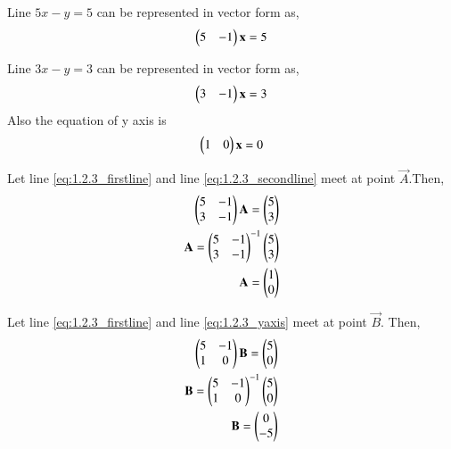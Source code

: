 
 Line $5x-y=5$ can be represented in vector form as,
\begin{align}
\label{eq:1.2.3_firstline}
\begin{pmatrix}5&-1\end{pmatrix}\mathbf{x}=5
\end{align}

 Line $3x-y=3$ can be represented in vector form as,
\begin{align}
\label{eq:1.2.3_secondline}
\begin{pmatrix}3&-1\end{pmatrix}\mathbf{x}=3
\end{align}
%
Also the equation of y axis is 
\begin{align}
\begin{pmatrix}1&0\end{pmatrix}\mathbf{x}=0
\label{eq:1.2.3_yaxis}
\end{align}

Let line \eqref{eq:1.2.3_firstline} and  line \eqref{eq:1.2.3_secondline} meet at point $\vec{A}$.Then, 
\begin{align}
\begin{pmatrix}5&-1\\3&-1\end{pmatrix}\mathbf{A} =\begin{pmatrix}5\\3\end{pmatrix}
\\
\mathbf{A}={\begin{pmatrix}5&-1\\3&-1\end{pmatrix}}^{-1}\begin{pmatrix}5\\3\end{pmatrix}
\\
\mathbf{A}=\begin{pmatrix}1\\0\end{pmatrix}
\end{align}

Let line \eqref{eq:1.2.3_firstline} and  line \eqref{eq:1.2.3_yaxis} meet at point $\vec{B}$. Then, 
\begin{align}
\begin{pmatrix}5&-1\\1&0\end{pmatrix}\mathbf{B} =\begin{pmatrix}5\\0\end{pmatrix}
\\
\mathbf{B}={\begin{pmatrix}5&-1\\1&0\end{pmatrix}}^{-1}\begin{pmatrix}5\\0\end{pmatrix}
\\
\mathbf{B}=\begin{pmatrix}0\\-5\end{pmatrix}
\end{align}

